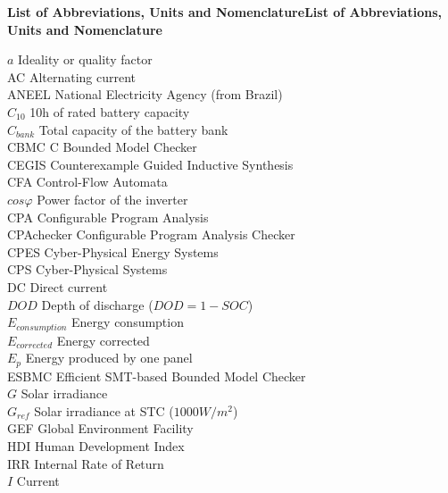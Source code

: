 \thispagestyle{plain}
\begin{center}
%    
%    
%    
    \vspace{0.9cm}
    \textbf{List of Abbreviations, Units and NomenclatureList of Abbreviations, Units and Nomenclature}
\end{center}

\noindent $a$ Ideality or quality factor \\
AC Alternating current \\
ANEEL National Electricity Agency (from Brazil) \\
$C_{10}$ 10h of rated battery capacity \\
$C_{bank}$ Total capacity of the battery bank \\
CBMC C Bounded Model Checker \\
CEGIS Counterexample Guided Inductive Synthesis \\
CFA Control-Flow Automata \\
$ cos \varphi $ Power factor of the inverter \\
CPA Configurable Program Analysis \\
CPAchecker Configurable Program Analysis Checker \\
CPES Cyber-Physical Energy Systems \\
CPS Cyber-Physical Systems \\
DC Direct current \\
$DOD$ Depth of discharge ($DOD=1-SOC$) \\
$E_{consumption}$ Energy consumption \\
$E_{corrected}$ Energy corrected \\
$E_{p}$ Energy produced by one panel \\
ESBMC Efficient SMT-based Bounded Model Checker \\
$G$ Solar irradiance \\
$ G_{ref} $ Solar irradiance at STC ($1000 W/m^{2}$) \\
GEF Global Environment Facility \\
HDI Human Development Index \\
IRR  Internal Rate of Return \\
$I$ Current \\
